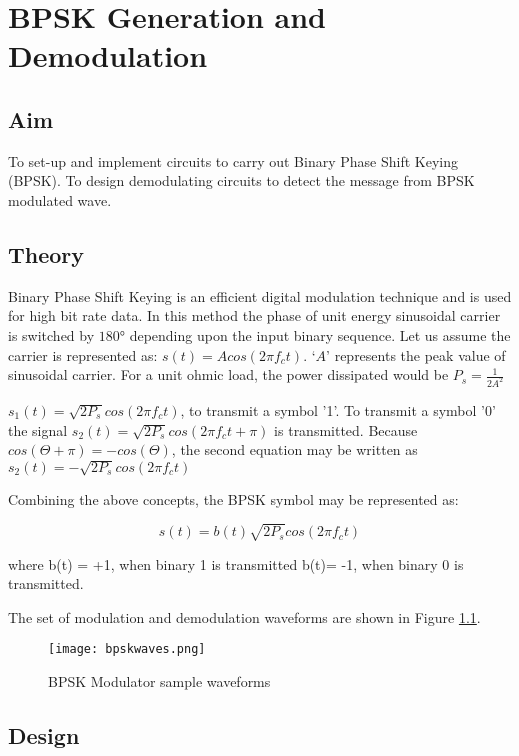 \chapter[BPSK Generation and Demodulation]{BPSK Generation and Demodulation}

\section*{Aim}
To set-up and implement circuits to carry out Binary Phase Shift Keying (BPSK). To design demodulating circuits to detect the message from BPSK modulated wave.
\section*{Theory}

Binary Phase Shift Keying is an efficient digital modulation technique and is used for high bit rate data. In this method the phase of unit energy sinusoidal carrier is switched by $180°$ depending upon the input binary sequence. 
\noindent
Let us assume the carrier is represented as: $s(t) = A cos(2\pi f_ct)$.
\noindent
`$A$' represents the peak value of sinusoidal carrier. For a unit ohmic load, the power dissipated would be $P_s = \frac{1}{2A^2}$


\noindent
$ s_1(t) = \sqrt{2P_s} cos (2\pi f_ct) $, to transmit a symbol '1'.
\noindent
To transmit a symbol '0' the signal $ s_2(t) = \sqrt{2P_s} cos (2\pi f_ct + \pi) $ is transmitted. Because $cos (\Theta+\pi) = -cos (\Theta)$, the second equation may be written as $ s_2(t) = - \sqrt{2P_s} cos (2\pi f_ct) $

Combining the above concepts, the BPSK symbol may be represented as:

\begin{equation*}
s(t)= b(t)  \sqrt{2P_s} cos (2\pi f_ct) 
\end{equation*}


where b(t) = +1, when binary 1 is transmitted
b(t)= -1, when binary 0 is transmitted.

The set of modulation and demodulation waveforms are shown in Figure \ref{bpsk-waveforms}.

\begin{figure}[h]
	\centering
	\texttt{[image: bpskwaves.png]}
	\caption{BPSK Modulator sample waveforms}
	\label{bpsk-waveforms}
\end{figure}


\section*{Design}
